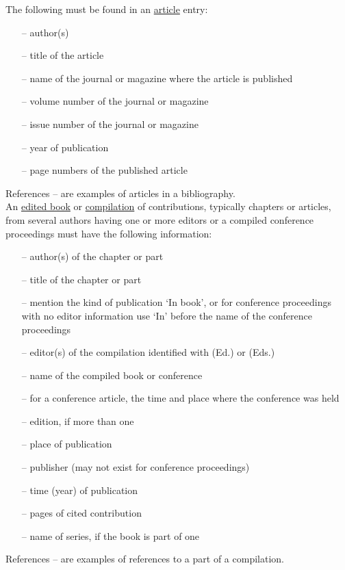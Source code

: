 \documentclass[english, 12pt, a4paper, sci, utf8, a-2b, online]{aaltothesis}
\begin{document}
\noindent
The following must be found in an \underline{article} entry:
\begin{itemize}
	\setlength{\itemsep}{-3pt}
\item[--]author(s)
\item[--]title of the article
\item[--]name of the journal or magazine where the article is published
\item[--]volume number of the journal or magazine
\item[--]issue number of the journal or magazine
\item[--]year of publication
\item[--]page numbers of the published article
\end{itemize}
References \cite{bcs}--\cite{Deschamps} are examples of articles in a 
bibliography.\\

\noindent
An \underline{edited book} or \underline{compilation} of contributions, 
typically chapters or articles, from several authors having one or more editors 
or a compiled conference proceedings must have the following information:
\begin{itemize}
\setlength{\itemsep}{-3pt}
\item[--]author(s) of the chapter or part
\item[--]title of the chapter or part
\item[--]mention the kind of publication `In book', or for conference 
proceedings with no editor information use `In' before the name of the 
conference proceedings
\item[--]editor(s) of the compilation identified with (Ed.) or (Eds.)
\item[--]name of the compiled book or conference
\item[--]for a conference article, the time and place where the conference was 
held
\item[--]edition, if more than one
\item[--]place of publication
\item[--]publisher (may not exist for conference proceedings)
\item[--]time (year) of publication
\item[--]pages of cited contribution
\item[--]name of series, if the book is part of one
\end{itemize}
References \cite{Sihvola}--\cite{Lindblom} are examples of references to a part 
of a compilation.\\
\end{document}
